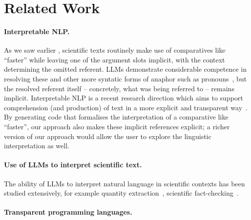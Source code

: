 \section{Related Work}
\label{sec:related}

\paragraph{Interpretable NLP.}

As we saw earlier , scientific texts routinely make use of comparatives like ``faster'' while
leaving one of the argument slots implicit, with the context determining the omitted referent. LLMs
demonstrate considerable competence in resolving these and other more syntatic forms of anaphor such as
pronouns~\citep{zhu25}, but the resolved referent itself -- concretely, what was being referred to -- remains
implicit. Interpretable NLP is a recent research direction which aims to support comprehension (and
production) of text in a more explicit and transparent way~\citep{yulan23}. By generating code that formalises
the interpretation of a comparative like ``faster'', our approach also makes these implicit references
explicit; a richer version of our approach would allow the user to explore the linguistic interpretation as
well. 

\paragraph{Use of LLMs to interpret scientific text.}

The ability of LLMs to interpret natural language in scientific contexts has been studied extensively, for example quantity extraction~\citep{bolucu23}, scientific fact-checking~\citep{abu-ahmad25}.

\paragraph{Transparent programming languages.}

\cite{perera22,bond25,psallidas18smoke}
